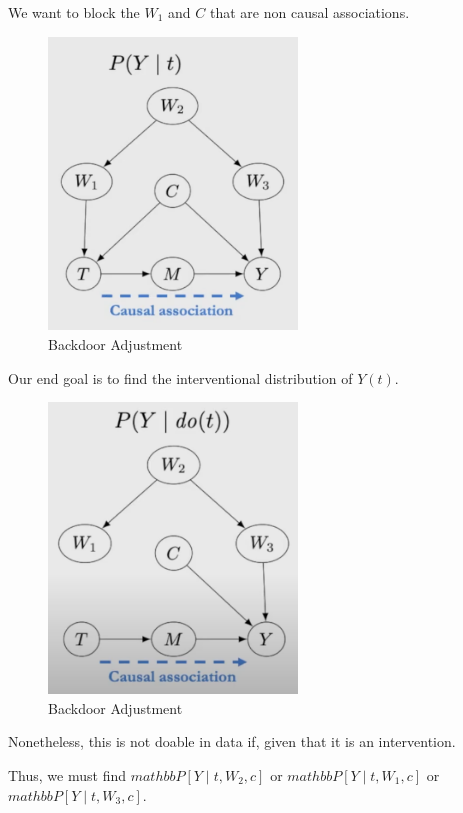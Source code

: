 \documentclass{article}
\begin{document}
We want to block the $W_1$ and $C$ that are non causal associations.

\begin{figure}[H]
  \centering
  \includegraphics[width=250px]{draft-photos/backdoor_adjustment_explained.png}
  \caption{Backdoor Adjustment}
  \label{fig:backdoor_adjustment_explained}
\end{figure}

Our end goal is to find the interventional distribution of $Y(t)$.

\begin{figure}[H]
  \centering
  \includegraphics[width=250px]{draft-photos/backdoor_adjustment_explained_goal.png}
  \caption{Backdoor Adjustment}
  \label{fig:backdoor_adjustment_explained_goal}
\end{figure}

Nonetheless, this is not doable in data if, given that it is an intervention.

Thus, we must find $mathbb{P}[Y \mid t, W_2, c]$ or $mathbb{P}[Y \mid t, W_1, c]$ or $mathbb{P}[Y \mid t, W_3, c]$.
\end{document}
